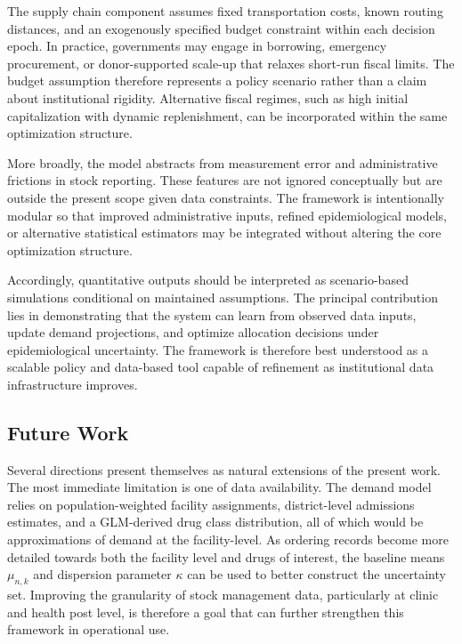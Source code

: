 \documentclass{article}
\begin{document}
The supply chain component assumes fixed transportation costs, known routing distances, and an exogenously specified budget constraint within each decision epoch. In practice, governments may engage in borrowing, emergency procurement, or donor-supported scale-up that relaxes short-run fiscal limits. The budget assumption therefore represents a policy scenario rather than a claim about institutional rigidity. Alternative fiscal regimes, such as high initial capitalization with dynamic replenishment, can be incorporated within the same optimization structure.

More broadly, the model abstracts from measurement error and administrative frictions in stock reporting. These features are not ignored conceptually but are outside the present scope given data constraints. The framework is intentionally modular so that improved administrative inputs, refined epidemiological models, or alternative statistical estimators may be integrated without altering the core optimization structure.

Accordingly, quantitative outputs should be interpreted as scenario-based simulations conditional on maintained assumptions. The principal contribution lies in demonstrating that the system can learn from observed data inputs, update demand projections, and optimize allocation decisions under epidemiological uncertainty. The framework is therefore best understood as a scalable policy and data-based tool capable of refinement as institutional data infrastructure improves.

\subsection{Future Work}

Several directions present themselves as natural extensions of the present work. The most immediate limitation is one of data availability. The demand model relies on population-weighted facility assignments, district-level admissions estimates, and a GLM-derived drug class distribution, all of which would be approximations of demand at the facility-level. As ordering records become more detailed towards both the facility level and drugs of interest, the baseline means $\mu_{n,k}$ and dispersion parameter $\kappa$ can be used to better construct the uncertainty set. Improving the granularity of stock management data, particularly at clinic and health post level, is therefore a goal that can further strengthen this framework in operational use.
\end{document}
